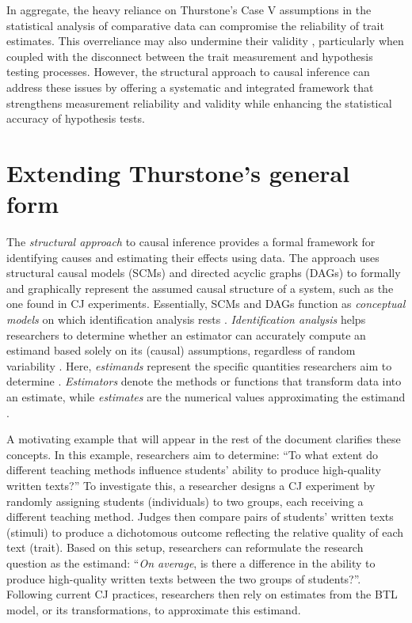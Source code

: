 \documentclass[
  authoryear,
  review,
  1p]{elsarticle}
\begin{document}
In aggregate, the heavy reliance on Thurstone's Case V assumptions in
the statistical analysis of comparative data can compromise the
reliability of trait estimates. This overreliance may also undermine
their validity \citep[pp.~2]{Perron_et_al_2015}, particularly when
coupled with the disconnect between the trait measurement and hypothesis
testing processes. However, the structural approach to causal inference
can address these issues by offering a systematic and integrated
framework that strengthens measurement reliability and validity while
enhancing the statistical accuracy of hypothesis tests.

\section{Extending Thurstone's general form}\label{sec-theoretical}

The \emph{structural approach} to causal inference provides a formal
framework for identifying causes and estimating their effects using
data. The approach uses structural causal models (SCMs) and directed
acyclic graphs (DAGs)
\citep{Pearl_2009, Pearl_et_al_2016, Gross_et_al_2018, Neal_2020} to
formally and graphically represent the assumed causal structure of a
system, such as the one found in CJ experiments. Essentially, SCMs and
DAGs function as \emph{conceptual models} on which identification
analysis rests \citep[pp.~4]{Schuessler_et_al_2023}.
\emph{Identification analysis} helps researchers to determine whether an
estimator can accurately compute an estimand based solely on its
(causal) assumptions, regardless of random variability
\citep[pp.~4]{Schuessler_et_al_2023}. Here, \emph{estimands} represent
the specific quantities researchers aim to determine
\citep{Everitt_et_al_2010}. \emph{Estimators} denote the methods or
functions that transform data into an estimate, while \emph{estimates}
are the numerical values approximating the estimand
\citep{Neal_2020, Everitt_et_al_2010}.

A motivating example that will appear in the rest of the document
clarifies these concepts. In this example, researchers aim to determine:
``To what extent do different teaching methods influence students'
ability to produce high-quality written texts?'' To investigate this, a
researcher designs a CJ experiment by randomly assigning students
(individuals) to two groups, each receiving a different teaching method.
Judges then compare pairs of students' written texts (stimuli) to
produce a dichotomous outcome reflecting the relative quality of each
text (trait). Based on this setup, researchers can reformulate the
research question as the estimand: ``\emph{On average}, is there a
difference in the ability to produce high-quality written texts between
the two groups of students?''. Following current CJ practices,
researchers then rely on estimates from the BTL model, or its
transformations, to approximate this estimand.
\end{document}
